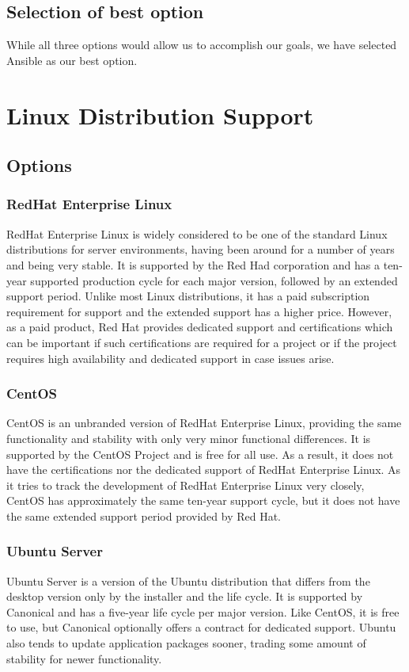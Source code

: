 \documentclass[10pt,letterpaper,onecolumn,journal]{IEEEtran}
\begin{document}
\subsection{Selection of best option}
While all three options would allow us to accomplish our goals, we have selected Ansible as our best option.

\section{Linux Distribution Support}
\subsection{Options}
\subsubsection{RedHat Enterprise Linux}
RedHat Enterprise Linux is widely considered to be one of the standard Linux distributions for server environments, having been around for a number of years and being very stable. It is supported by the Red Had corporation and has a ten-year supported production cycle for each major version, followed by an extended support period\cite{rhlife}. Unlike most Linux distributions, it has a paid subscription requirement for support and the extended support has a higher price. However, as a paid product, Red Hat provides dedicated support and certifications which can be important if such certifications are required for a project or if the project requires high availability and dedicated support in case issues arise.
\subsubsection{CentOS}
CentOS is an unbranded version of RedHat Enterprise Linux, providing the same functionality and stability with only very minor functional differences. It is supported by the CentOS Project and is free for all use. As a result, it does not have the certifications nor the dedicated support of RedHat Enterprise Linux. As it tries to track the development of RedHat Enterprise Linux very closely, CentOS has approximately the same ten-year support cycle\cite{centlife}, but it does not have the same extended support period provided by Red Hat.
\subsubsection{Ubuntu Server}
Ubuntu Server is a version of the Ubuntu distribution that differs from the desktop version only by the installer and the life cycle\cite{ubuntulife}. It is supported by Canonical and has a five-year life cycle per major version. Like CentOS, it is free to use, but Canonical optionally offers a contract for dedicated support. Ubuntu also tends to update application packages sooner, trading some amount of stability for newer functionality.
\end{document}
